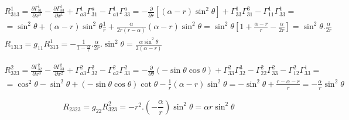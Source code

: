 \documentclass[a4paper,12pt]{article}
\begin{document}
    \newline
    \begin{equation*}
        \begin{aligned}
            R^1_{313}=\frac{\partial\varGamma^1_{31}}{\partial x^3} - \frac{\partial\varGamma^1_{33}}{\partial x^1}+\varGamma^1_{a3}\varGamma^a_{31}-\varGamma^1_{a1}\varGamma^a_{33}
            = -\frac{\partial}{\partial r} [(\alpha-r)\sin^2\theta] + \varGamma^1_{33}\varGamma^3_{31} - \varGamma^1_{11}\varGamma^1_{33} = \\
            = \sin^2\theta + (\alpha-r)\sin^2\theta\frac{1}{r} + \frac{\alpha}{2r(r-\alpha)}(\alpha-r)\sin^2\theta
            = \sin^2\theta\left[ 1 + \frac{\alpha -r}{r} - \frac{\alpha}{2r} \right] = \sin^2\theta.\frac{\alpha}{2r}
            \\
            R_{1313}=g_{11}R^1_{313} = -\frac{1}{1-\frac{\alpha}{r}}.\frac{\alpha}{2r}.\sin^2\theta = \frac{\alpha\sin^2\theta}{2(\alpha-r)}
        \end{aligned}
    \end{equation*}
    \newline

    \begin{equation*}
        \begin{aligned}
            R^2_{323} = \frac{\partial\varGamma^2_{32}}{\partial x^3} - \frac{\partial\varGamma^2_{33}}{\partial x^2} + \varGamma^2_{a3}\varGamma^2_{32} - \varGamma^2_{a2}\varGamma^2_{33} = -\frac{\partial}{\partial\theta}(-\sin\theta\cos\theta) + \varGamma^2_{33}\varGamma^3_{32}-\varGamma^2_{22}\varGamma^2_{33}-\varGamma^2_{12}\varGamma^1_{33}= \\
            = \cos^2\theta-\sin^2\theta + (-\sin\theta\cos\theta)\cot\theta - \frac{1}{r}(\alpha-r)\sin^2\theta = -\sin^2\theta + \frac{r-\alpha-r}{r}=-\frac{\alpha}{r}\sin^2\theta
        \end{aligned}
    \end{equation*}

    \begin{equation*}
        R_{2323}=g_{22}R^2_{323}=-r^2.\left( -\frac{\alpha}{r} \right)\sin^2\theta=\alpha r\sin^2\theta
    \end{equation*}
\end{document}
